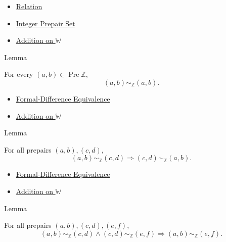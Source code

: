 \begin{dependencies}
\begin{itemize}
  \item \hyperref[def:relation]{Relation}
  \item \hyperref[def:integer-prepair-set]{Integer Prepair Set}
  \item \hyperref[def:addition-on-w]{Addition on $\mathbb{W}$}
\end{itemize}
\end{dependencies}

\begin{lemmabox}{Lemma}
\begin{lemma}
\label{lem:formal-difference-equivalence-reflexive}
For every $(a,b)\in\operatorname{Pre}\mathbb{Z}$,
\[
(a,b)\sim_{\mathbb{Z}}(a,b).
\]
\end{lemma}
\end{lemmabox}

\begin{dependencies}
\begin{itemize}
  \item \hyperref[def:formal-difference-equivalence]{Formal-Difference Equivalence}
  \item \hyperref[def:addition-on-w]{Addition on $\mathbb{W}$}
\end{itemize}
\end{dependencies}

\begin{lemmabox}{Lemma}
\begin{lemma}
\label{lem:formal-difference-equivalence-symmetric}
For all prepairs $(a,b),(c,d)$,
\[
(a,b)\sim_{\mathbb{Z}}(c,d)
\Longrightarrow
(c,d)\sim_{\mathbb{Z}}(a,b).
\]
\end{lemma}
\end{lemmabox}

\begin{dependencies}
\begin{itemize}
  \item \hyperref[def:formal-difference-equivalence]{Formal-Difference Equivalence}
  \item \hyperref[def:addition-on-w]{Addition on $\mathbb{W}$}
\end{itemize}
\end{dependencies}

\begin{lemmabox}{Lemma}
\begin{lemma}
\label{lem:formal-difference-equivalence-transitive}
For all prepairs $(a,b),(c,d),(e,f)$,
\[
(a,b)\sim_{\mathbb{Z}}(c,d)\land
(c,d)\sim_{\mathbb{Z}}(e,f)
\Longrightarrow
(a,b)\sim_{\mathbb{Z}}(e,f).
\]
\end{lemma}
\end{lemmabox}

